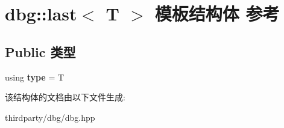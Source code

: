 \hypertarget{structdbg_1_1last_3_01T_01_4}{}\section{dbg\+:\+:last$<$ T $>$ 模板结构体 参考}
\label{structdbg_1_1last_3_01T_01_4}
\subsection*{Public 类型}
\begin{DoxyCompactItemize}
\item 
\mbox{\label{structdbg_1_1last_3_01T_01_4_a6715c2f60dfaa8a096517ce45ff43999}} 
using {\bfseries type} = T
\end{DoxyCompactItemize}


该结构体的文档由以下文件生成\+:\begin{DoxyCompactItemize}
\item 
thirdparty/dbg/dbg.\+hpp\end{DoxyCompactItemize}

